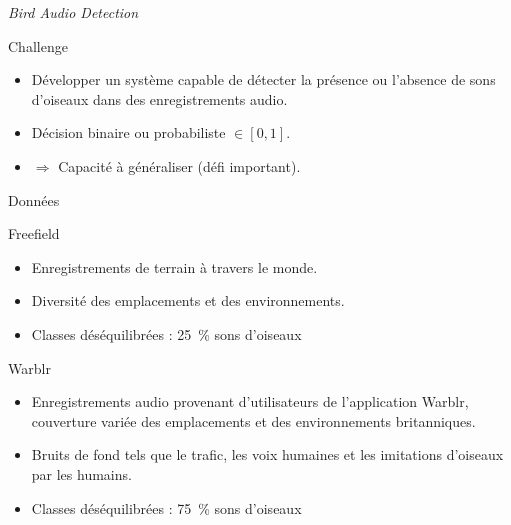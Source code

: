 \documentclass[compress,xcolor=table]{beamer}
\begin{document}
\begin{frame}{\textit{Bird Audio Detection}}

    \begin{block}{Challenge}
        \begin{itemize}
            \item Développer un système capable de détecter la présence ou l'absence de sons d'oiseaux dans des enregistrements audio.
            \item Décision binaire ou probabiliste $\in [0,1]$.
            \item $\Rightarrow$ Capacité à généraliser (défi important).
        \end{itemize}
    \end{block}

\end{frame}

\begin{frame}{Données}

    \begin{block}{Freefield}
        \begin{itemize}
            \item Enregistrements de terrain à travers le monde.
            \item Diversité des emplacements et des environnements.
            \item \warning Classes déséquilibrées : 25~\% sons d'oiseaux
        \end{itemize}
    \end{block}

    \begin{block}{Warblr}
        \begin{itemize}
            \item Enregistrements audio provenant d'utilisateurs de l'application Warblr, couverture variée des emplacements et des environnements britanniques.
            \item Bruits de fond tels que le trafic, les voix humaines et les imitations d'oiseaux par les humains.
            \item \warning Classes déséquilibrées : 75~\% sons d'oiseaux
        \end{itemize}
    \end{block}

\end{frame}
\end{document}

